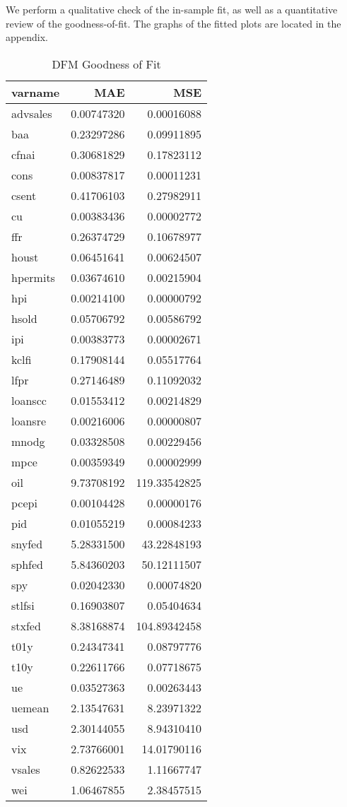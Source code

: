 \documentclass[11pt, letterpaper]{article}\usepackage[]{graphicx}\usepackage[]{color}
\begin{document}
We perform a qualitative check of the in-sample fit, as well as a quantitative review of the goodness-of-fit. The graphs of the fitted plots are located in the appendix.
\begin{table}[H]
\centering
\begingroup\footnotesize
\begin{tabular}{lrr}
  \hline
varname & MAE & MSE \\ 
  \hline
advsales & 0.00747320 & 0.00016088 \\ 
  baa & 0.23297286 & 0.09911895 \\ 
  cfnai & 0.30681829 & 0.17823112 \\ 
  cons & 0.00837817 & 0.00011231 \\ 
  csent & 0.41706103 & 0.27982911 \\ 
  cu & 0.00383436 & 0.00002772 \\ 
  ffr & 0.26374729 & 0.10678977 \\ 
  houst & 0.06451641 & 0.00624507 \\ 
  hpermits & 0.03674610 & 0.00215904 \\ 
  hpi & 0.00214100 & 0.00000792 \\ 
  hsold & 0.05706792 & 0.00586792 \\ 
  ipi & 0.00383773 & 0.00002671 \\ 
  kclfi & 0.17908144 & 0.05517764 \\ 
  lfpr & 0.27146489 & 0.11092032 \\ 
  loanscc & 0.01553412 & 0.00214829 \\ 
  loansre & 0.00216006 & 0.00000807 \\ 
  mnodg & 0.03328508 & 0.00229456 \\ 
  mpce & 0.00359349 & 0.00002999 \\ 
  oil & 9.73708192 & 119.33542825 \\ 
  pcepi & 0.00104428 & 0.00000176 \\ 
  pid & 0.01055219 & 0.00084233 \\ 
  snyfed & 5.28331500 & 43.22848193 \\ 
  sphfed & 5.84360203 & 50.12111507 \\ 
  spy & 0.02042330 & 0.00074820 \\ 
  stlfsi & 0.16903807 & 0.05404634 \\ 
  stxfed & 8.38168874 & 104.89342458 \\ 
  t01y & 0.24347341 & 0.08797776 \\ 
  t10y & 0.22611766 & 0.07718675 \\ 
  ue & 0.03527363 & 0.00263443 \\ 
  uemean & 2.13547631 & 8.23971322 \\ 
  usd & 2.30144055 & 8.94310410 \\ 
  vix & 2.73766001 & 14.01790116 \\ 
  vsales & 0.82622533 & 1.11667747 \\ 
  wei & 1.06467855 & 2.38457515 \\ 
   \hline
\end{tabular}
\endgroup
\caption{DFM Goodness of Fit} 
\end{table}
\end{document}
